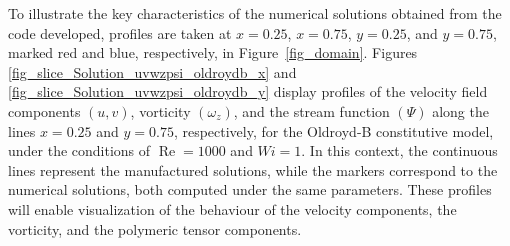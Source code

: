 \documentclass[preprint, 12pt]{elsarticle}
\begin{document}
To illustrate the key characteristics of the numerical solutions obtained from the code developed, profiles are taken at $x=0.25$, $x=0.75$, $y=0.25$, and $y=0.75$, marked red and blue, respectively, in Figure~\ref{fig_domain}. Figures \ref{fig_slice_Solution_uvwzpsi_oldroydb_x} and \ref{fig_slice_Solution_uvwzpsi_oldroydb_y} display profiles of the velocity field components $(u, v)$, vorticity $(\omega_z)$, and the stream function $(\Psi)$ along the lines $x=0.25$ and $y=0.75$, respectively, for the Oldroyd-B constitutive model, under the conditions of $\operatorname{Re}=1000$ and $Wi=1$. In this context, the continuous lines represent the manufactured solutions, while the markers correspond to the numerical solutions, both computed under the same parameters. These profiles will enable visualization of the behaviour of the velocity components, the vorticity, and the polymeric tensor components.
\end{document}
